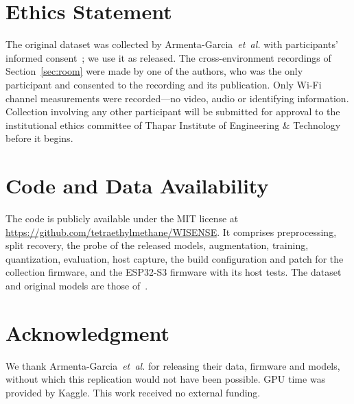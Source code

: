 \documentclass[journal]{IEEEtran}
\begin{document}
\section*{Ethics Statement}
The original dataset was collected by Armenta-Garcia~\textit{et~al.} with participants'
informed consent~\cite{armenta2025tools}; we use it as released. The cross-environment
recordings of Section~\ref{sec:room} were made by one of the authors, who was the only
participant and consented to the recording and its publication. Only Wi-Fi channel
measurements were recorded---no video, audio or identifying information. Collection
involving any other participant will be submitted for approval to the institutional
ethics committee of Thapar Institute of Engineering \& Technology before it begins.

\section*{Code and Data Availability}
The code is publicly available under the MIT license at
\url{https://github.com/tetraethylmethane/WISENSE}. It comprises preprocessing,
split recovery, the probe of the released models, augmentation, training,
quantization, evaluation, host capture, the build configuration and patch for the
collection firmware, and the ESP32-S3 firmware with its host tests. The dataset and
original models are those of~\cite{armenta2025repo}.

\section*{Acknowledgment}
We thank Armenta-Garcia~\textit{et~al.} for releasing their data, firmware and
models, without which this replication would not have been possible. GPU time was
provided by Kaggle. This work received no external funding.



\end{document}
